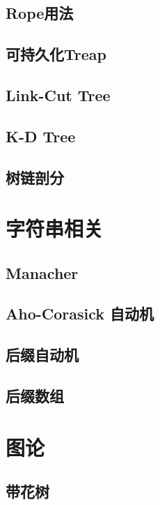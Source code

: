 \documentclass[10pt]{article}
\begin{document}
		
	\subsection{Rope用法}
	
	\subsection{可持久化Treap}
	
	\subsection{Link-Cut Tree}

	\subsection{K-D Tree}

	\subsection{树链剖分}

\section{字符串相关}
	\subsection{Manacher}

	\subsection{Aho-Corasick 自动机}

	\subsection{后缀自动机}

	\subsection{后缀数组}

\section{图论}
	\subsection{带花树}
\end{document}
